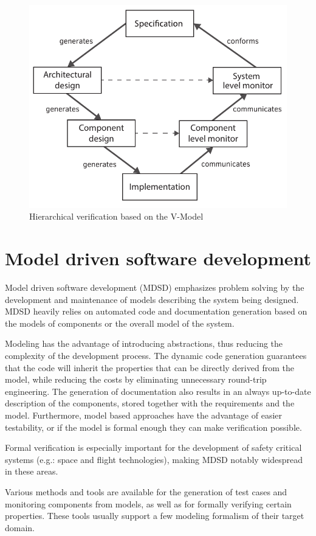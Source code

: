 \begin{figure}[h]
	\centering
	\includegraphics[width=0.8\linewidth]{include/figures/chapter_1/rv_vmodel}
	\caption{Hierarchical verification based on the V-Model}
	\label{fig:intro:rvmodel}
\end{figure}

\section*{Model driven software development}

Model driven software development (MDSD) emphasizes problem solving by the development and maintenance of models describing the system being designed. MDSD heavily relies on automated code and documentation generation based on the models of components or the overall model of the system. 

Modeling has the advantage of introducing abstractions, thus reducing the complexity of the development process. The dynamic code generation guarantees that the code will inherit the properties that can be directly derived from the model, while reducing the costs by eliminating unnecessary round-trip engineering. The generation of documentation also results in an always up-to-date description of the components, stored together with the requirements and the model. Furthermore, model based approaches have the advantage of easier testability, or if the model is formal enough they can make verification possible.

Formal verification is especially important for the development of safety critical systems (e.g.: space and flight technologies), making MDSD notably widespread in these areas.

Various methods and tools are available for the generation of test cases and monitoring components from models, as well as for formally verifying certain properties. These tools usually support a few modeling formalism of their target domain.

